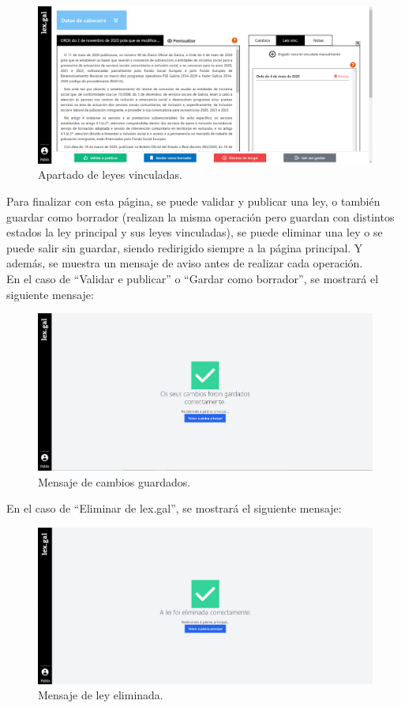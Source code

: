 \begin{figure}[H]
\centerline{\includegraphics[width=15cm]{figuras/manualUsuario/LeyesVinculadas.PNG}}
\caption{Apartado de leyes vinculadas.}
\label{enlaceLeyesVinculadas}
\end{figure}

Para finalizar con esta página, se puede validar y publicar una ley, o también guardar como borrador (realizan la misma operación pero guardan con distintos estados la ley principal y sus leyes vinculadas), se puede eliminar una ley o se puede salir sin guardar, siendo redirigido siempre a la página principal. Y además, se muestra un mensaje de aviso antes de realizar cada operación.
\\

En el caso de ``Validar e publicar'' o ``Gardar como borrador'', se mostrará el siguiente mensaje:

\begin{figure}[H]
\centerline{\includegraphics[width=15cm]{figuras/manualUsuario/MensajeGuardado.PNG}}
\caption{Mensaje de cambios guardados.}
\label{enlaceCambiosGuardados}
\end{figure}

En el caso de ``Eliminar de lex.gal'', se mostrará el siguiente mensaje:

\begin{figure}[H]
\centerline{\includegraphics[width=15cm]{figuras/manualUsuario/MensajeEliminada.PNG}}
\caption{Mensaje de ley eliminada.}
\label{enlaceLeyEliminada}
\end{figure}